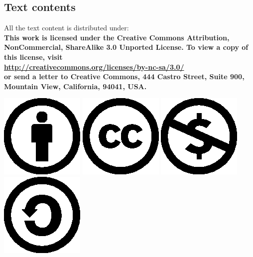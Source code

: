 \newpage

\subsection*{Text contents}
All the text content is distributed under:\\
\textbf{ This work is licensed under the Creative Commons Attribution,
  NonCommercial, ShareAlike 3.0 Unported License. To view a
  copy of this license, visit\\
  \href{http://creativecommons.org/licenses/by-nc-sa/3.0/}{http://creativecommons.org/licenses/by-nc-sa/3.0/}\\
  or send a letter to Creative Commons, 444 Castro Street, Suite 900,
  Mountain View, California, 94041, USA.}

\begin{center}
\includegraphics{cc-icons-eps/by}
\includegraphics{cc-icons-eps/cc}
\includegraphics{cc-icons-eps/nc}
\includegraphics{cc-icons-eps/sa}
\end{center}

